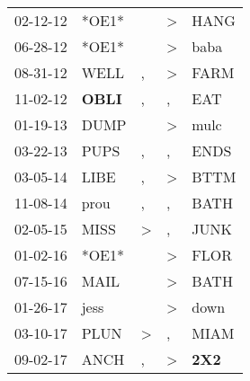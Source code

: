 \begin{supertabular}{p{0.07\textwidth}p{0.06\textwidth}p{0.02\textwidth}p{0.02\textwidth}p{0.06\textwidth}}
          02-12-12\textsuperscript{} &                            *OE1* &                  &     \textgreater &           HANG\textsuperscript{} \\
          06-28-12\textsuperscript{} &                            *OE1* &                  &     \textgreater &           baba\textsuperscript{} \\
          08-31-12\textsuperscript{} &           WELL\textsuperscript{} &                , &     \textgreater &           FARM\textsuperscript{} \\
          11-02-12\textsuperscript{} &  \textbf{OBLI\textsuperscript{}} &                , &                , &            EAT\textsuperscript{} \\
          01-19-13\textsuperscript{} &           DUMP\textsuperscript{} &                  &     \textgreater &           mulc\textsuperscript{} \\
          03-22-13\textsuperscript{} &           PUPS\textsuperscript{} &                , &                , &           ENDS\textsuperscript{} \\
          03-05-14\textsuperscript{} &           LIBE\textsuperscript{} &                , &     \textgreater &           BTTM\textsuperscript{} \\
          11-08-14\textsuperscript{} &           prou\textsuperscript{} &                , &                , &           BATH\textsuperscript{} \\
          02-05-15\textsuperscript{} &           MISS\textsuperscript{} &     \textgreater &                , &           JUNK\textsuperscript{} \\
          01-02-16\textsuperscript{} &                            *OE1* &                  &     \textgreater &           FLOR\textsuperscript{} \\
          07-15-16\textsuperscript{} &           MAIL\textsuperscript{} &                  &     \textgreater &           BATH\textsuperscript{} \\
          01-26-17\textsuperscript{} &           jess\textsuperscript{} &                  &     \textgreater &           down\textsuperscript{} \\
          03-10-17\textsuperscript{} &           PLUN\textsuperscript{} &     \textgreater &                , &           MIAM\textsuperscript{} \\
          09-02-17\textsuperscript{} &           ANCH\textsuperscript{} &                , &     \textgreater &   \textbf{2X2\textsuperscript{}} \\

\end{supertabular}

